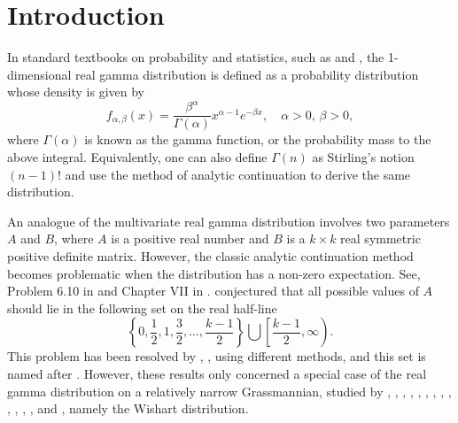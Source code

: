 \documentclass{amsart}
\theoremstyle{definition}
\numberwithin{equation}{section}
\begin{document}
\maketitle

\section{Introduction}

In standard textbooks on probability and statistics, such as \cite{gupta2018matrix} and \cite{mathai2022mul}, the 1-dimensional real gamma distribution is defined as a probability distribution whose density is given by
\[f_{\alpha,\beta}(x) = \frac{\beta^{\alpha}}{\varGamma(\alpha)}x^{\alpha -1} e^{- \beta x}, \quad \alpha>0, \, \beta>0,\]
where $\varGamma(\alpha)$ is known as the gamma function, or the probability mass to the above integral. Equivalently, one can also define $\varGamma(n)$ as Stirling's notion $(n-1)!$ and use the method of analytic continuation to derive the same distribution.


An analogue of the multivariate real gamma distribution involves two parameters $A$ and $B$, where $A$ is a positive real number and $B$ is a $k\times k$ real symmetric positive definite matrix. However, the classic analytic continuation method becomes problematic when the distribution has a non-zero expectation. See, Problem 6.10 in \cite{eaton2007multivariate} and Chapter VII in \cite{faraut1994analysis}. \cite{eaton2007multivariate} conjectured that all possible values of $A$ should lie in the following set on the real half-line
\[\left\{0,\frac{1}{2},1,\frac{3}{2},\dots,\frac{k-1}{2}\right\}\bigcup \left[\frac{k-1}{2},\infty\right).\]
This problem has been resolved by \cite{peddada1991}, \cite{letac2018laplace}, \cite{mayerhofer2019wishart} using different methods, and this set is named after \cite{gindikin1964analysis}. However, these results only concerned a special case of the real gamma distribution on a relatively narrow Grassmannian, studied by \cite{james1974generalized}, \cite{grossandrichards1987trans}, \cite{Shimura1990}, \cite{beerends1993certain}, \cite{Kazhdan1993I-IV}, \cite{johansson1997random,johansson2001discrete}, \cite{grinberg2004radon}, \cite{Postnikov2005affine}, \cite{Bernig2011aom}, \cite{Doubrov2018}, \cite{hedenmalm2021planar}, \cite{Galashin2022flag}, \cite{Kimura2024hyper}, and \cite{kubo2025intertwining}, namely the Wishart distribution.
\end{document}
